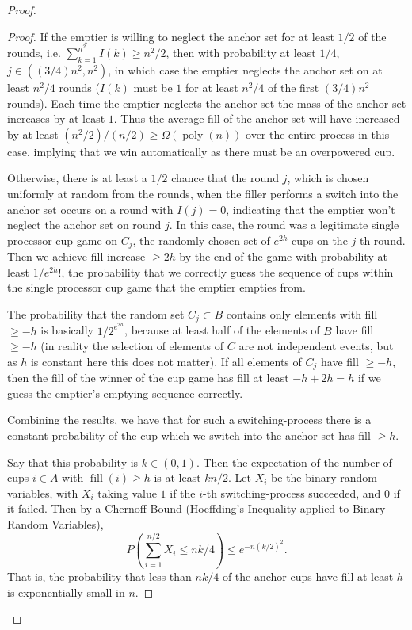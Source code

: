 \documentclass[twocolumn]{article}[11pt]
\DeclareMathOperator{\poly}{\text{poly}}
\DeclareMathOperator{\fil}{\text{fill}}
\begin{document}
\begin{proof}
\begin{proof}
  If the emptier is willing to neglect the anchor set for at least $1/2$ of the
  rounds, i.e. $\sum_{k=1}^{n^2} I(k) \ge n^2 / 2$, then with probability at
  least $1/4$, $j \in ((3/4) n^2, n^2)$, in which case the emptier neglects the anchor set
  on at least $n^2/4$ rounds ($I(k)$ must be $1$ for at least $n^2/4$ of the
  first $(3/4)n^2$ rounds). Each time the emptier neglects the anchor set the
  mass of the anchor set increases by at least $1$. Thus the average fill of the anchor
  set will have increased by at least $(n^2/2)/(n/2) \ge \Omega(\poly(n))$ over the
  entire process in this case, implying that we  win automatically as there
  must be an overpowered cup. 

  Otherwise, there is at least a $1/2$ chance that the round $j$, which is
  chosen uniformly at random from the rounds, when the filler performs a switch
  into the anchor set occurs on a round with $I(j)=0$, indicating that the emptier
  won't neglect the anchor set on round $j$. In this case, the round was a
  legitimate single processor cup game on $C_j$, the randomly chosen set of
  $e^{2h}$ cups on the $j$-th round. Then we achieve fill increase $\ge 2h$ by the
  end of the game with probability at least $1/e^{2h}!$, the probability that we
  correctly guess the sequence of cups within the single processor cup game
  that the emptier empties from. 

  The probability that the random set $C_j \subset B$ contains only elements
  with fill $\ge -h$ is basically $1/2^{e^{2h}}$, because at least half of the
  elements of $B$ have fill $\ge -h$ ({\color{red}in reality the selection of
    elements of $C$ are not independent events, but as $h$ is constant here this
  does not matter}). If all elements of $C_j$ have fill $\ge -h$, then the fill
  of the winner of the cup game has fill at least $-h + 2h = h$ if we guess the
  emptier's emptying sequence correctly.

  Combining the results, we have that for such a switching-process there is a
  constant probability of the cup which we switch into the anchor set has fill
  $\ge h$. 

  Say that this probability is $k \in (0,1)$. Then the expectation of the
  number of cups $i \in A$ with $\fil(i) \ge h$ is at least $kn/2$. Let $X_i$
  be the binary random variables, with $X_i$ taking value $1$ if the $i$-th
  switching-process succeeded, and $0$ if it failed. Then by a Chernoff Bound
  (Hoeffding's Inequality applied to Binary Random Variables),
  $$P\left(\sum_{i=1}^{n/2} X_i\le nk/4\right) \le e^{-n(k/2)^2}.$$ 
  That is, the probability that less than $nk/4$ of the anchor cups have fill
  at least $h$ is exponentially small in $n$.


\end{proof}
\end{proof}
\end{document}
